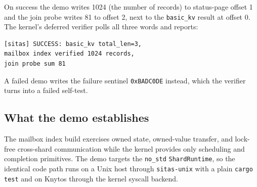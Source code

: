On success the demo writes 1024 (the number of records) to status-page
offset 1 and the join probe writes 81 to offset 2, next to the
\texttt{basic\_kv} result at offset 0. The kernel's deferred verifier polls
all three words and reports:

\begin{verbatim}
[sitas] SUCCESS: basic_kv total_len=3,
mailbox index verified 1024 records,
join probe sum 81
\end{verbatim}

A failed demo writes the failure sentinel \texttt{0xBADC0DE} instead, which
the verifier turns into a failed self-test.

\subsection{What the demo establishes}

The mailbox index build exercises owned state, owned-value transfer, and
lock-free cross-shard communication while the kernel provides only scheduling
and completion primitives. The demo targets the \texttt{no\_std}
\texttt{ShardRuntime}, so the identical code path runs on a Unix host through
\texttt{sitas-unix} with a plain \texttt{cargo test} and on Knytos through
the kernel syscall backend.

\endinput
